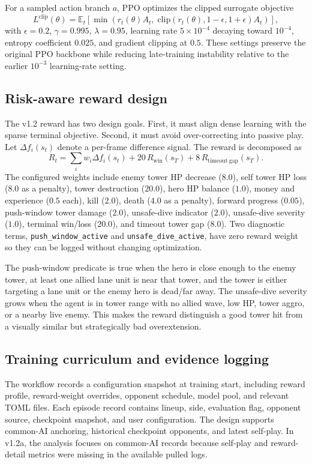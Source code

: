 \documentclass{article}
\begin{document}
For a sampled action branch $a$, PPO optimizes the clipped surrogate objective
\[
  L^{\mathrm{clip}}(\theta)=
  \mathbb{E}_t\left[
  \min\left(r_t(\theta) A_t,\;
  \mathrm{clip}(r_t(\theta),1-\epsilon,1+\epsilon) A_t\right)
  \right],
\]
with $\epsilon=0.2$, $\gamma=0.995$, $\lambda=0.95$, learning rate $5\times10^{-4}$ decaying toward $10^{-4}$, entropy coefficient $0.025$, and gradient clipping at $0.5$. These settings preserve the original PPO backbone while reducing late-training instability relative to the earlier $10^{-3}$ learning-rate setting.

\subsection{Risk-aware reward design}

The v1.2 reward has two design goals. First, it must align dense learning with the sparse terminal objective. Second, it must avoid over-correcting into passive play. Let $\Delta f_i(s_t)$ denote a per-frame difference signal. The reward is decomposed as
\[
R_t =
\sum_i w_i \Delta f_i(s_t)
 + 20\,R_{\mathrm{win}}(s_T)
 + 8\,R_{\mathrm{timeout\ gap}}(s_T).
\]
The configured weights include enemy tower HP decrease ($8.0$), self tower HP loss ($8.0$ as a penalty), tower destruction ($20.0$), hero HP balance ($1.0$), money and experience ($0.5$ each), kill ($2.0$), death ($4.0$ as a penalty), forward progress ($0.05$), push-window tower damage ($2.0$), unsafe-dive indicator ($2.0$), unsafe-dive severity ($1.0$), terminal win/loss ($20.0$), and timeout tower gap ($8.0$). Two diagnostic terms, \texttt{push\_window\_active} and \texttt{unsafe\_dive\_active}, have zero reward weight so they can be logged without changing optimization.

The push-window predicate is true when the hero is close enough to the enemy tower, at least one allied lane unit is near that tower, and the tower is either targeting a lane unit or the enemy hero is dead/far away. The unsafe-dive severity grows when the agent is in tower range with no allied wave, low HP, tower aggro, or a nearby live enemy. This makes the reward distinguish a good tower hit from a visually similar but strategically bad overextension.

\subsection{Training curriculum and evidence logging}

The workflow records a configuration snapshot at training start, including reward profile, reward-weight overrides, opponent schedule, model pool, and relevant TOML files. Each episode record contains lineup, side, evaluation flag, opponent source, checkpoint snapshot, and user configuration. The design supports common-AI anchoring, historical checkpoint opponents, and latest self-play. In v1.2a, the analysis focuses on common-AI records because self-play and reward-detail metrics were missing in the available pulled logs.
\end{document}

